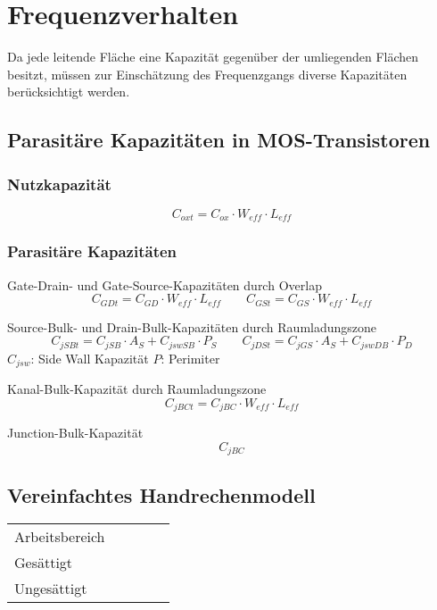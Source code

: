 \section{Frequenzverhalten}

Da jede leitende Fläche eine Kapazität gegenüber der umliegenden Flächen besitzt, müssen zur Einschätzung des Frequenzgangs diverse Kapazitäten berücksichtigt werden.

\subsection{Parasitäre Kapazitäten in MOS-Transistoren}

\subsubsection{Nutzkapazität}
\[
    C_{oxt} = C_{ox} \cdot W_{eff} \cdot L_{eff}
\]

\subsubsection{Parasitäre Kapazitäten}
Gate-Drain- und Gate-Source-Kapazitäten durch Overlap
\[
    C_{GDt} = C_{GD} \cdot W_{eff} \cdot L_{eff}
    \qquad
    C_{GSt} = C_{GS} \cdot W_{eff} \cdot L_{eff}
\]

Source-Bulk- und Drain-Bulk-Kapazitäten durch Raumladungszone
\[
    C_{jSBt} = C_{jSB} \cdot A_S + C_{jswSB} \cdot P_S
    \qquad
    C_{jDSt} = C_{jGS} \cdot A_S + C_{jswDB} \cdot P_D
\]
$C_{jsw}$: Side Wall Kapazität
$P$: Perimiter

Kanal-Bulk-Kapazität durch Raumladungszone
\[
    C_{jBCt} = C_{jBC} \cdot W_{eff} \cdot L_{eff}
\]

Junction-Bulk-Kapazität
\[
    C_{jBC}
\]

\subsection{Vereinfachtes Handrechenmodell}


\begin{tabular}{lllll}
    Arbeitsbereich & & & & \\
    Gesättigt & & & & \\
    Ungesättigt & & & & \\
\end{tabular}


